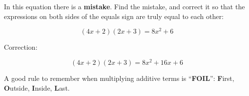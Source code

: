 

In this equation there is a {\bf mistake}.  Find the mistake, and correct it so that the expressions on both sides of the equals sign are truly equal to each other:

$$(4x + 2)(2x + 3) = 8x^2 + 6$$







Correction:

$$(4x + 2)(2x + 3) = 8x^2 + 16x + 6$$







A good rule to remember when multiplying additive terms is ``{\bf FOIL}'': {\bf F}irst, {\bf O}utside, {\bf I}nside, {\bf L}ast.




